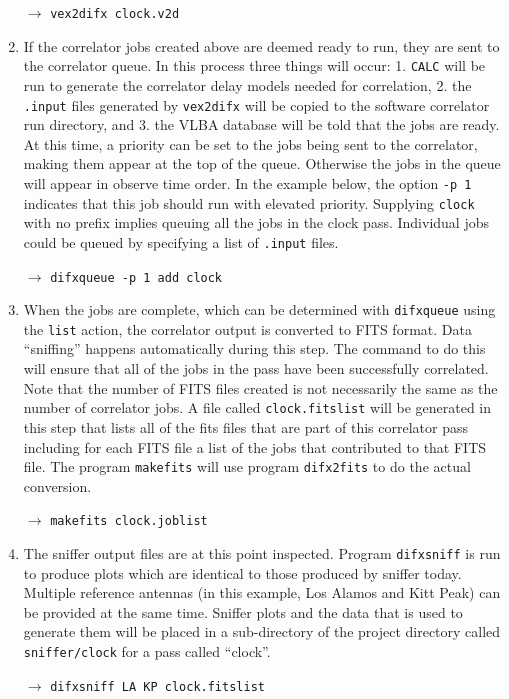 \begin{enumerate}
$\longrightarrow$ {\tt vex2difx clock.v2d}

\item
If the correlator jobs created above are deemed ready to run, they are sent to the correlator queue.
In this process three things will occur: 1. {\tt CALC} will be run to generate the correlator delay models needed for correlation, 2. the {\tt .input} files generated by {\tt vex2difx} will be copied to the software correlator run directory, and 3. the VLBA database will be told that the jobs are ready.
At this time, a priority can be set to the jobs being sent to the correlator, making them appear at the top of the queue.
Otherwise the jobs in the queue will appear in observe time order.
In the example below, the option {\tt -p 1} indicates that this job should run with elevated priority.
Supplying {\tt clock} with no prefix implies queuing all the jobs in the clock pass.
Individual jobs could be queued by specifying a list of {\tt .input} files.

$\longrightarrow$ {\tt difxqueue -p 1 add clock}

\item
When the jobs are complete, which can be determined with {\tt difxqueue} using the {\tt list} action, the correlator output is converted to FITS format.
Data ``sniffing'' happens automatically during this step.
The command to do this will ensure that all of the jobs in the pass have been successfully correlated.
Note that the number of FITS files created is not necessarily the same as the number of correlator jobs.
A file called {\tt clock.fitslist} will be generated in this step that lists all of the fits files that are part of this correlator pass including for each FITS file a list of the jobs that contributed to that FITS file. 
The program {\tt makefits} will use program {\tt difx2fits} to do the actual conversion.


$\longrightarrow$ {\tt makefits clock.joblist}

\item
The sniffer output files are at this point inspected.
Program {\tt difxsniff} is run to produce plots which are identical to those produced by sniffer today. 
Multiple reference antennas (in this example, Los Alamos and Kitt Peak) can be provided at the same time.
Sniffer plots and the data that is used to generate them will be placed in a sub-directory of the project directory called {\tt sniffer/clock} for a pass called ``clock''.

$\longrightarrow$ {\tt difxsniff LA KP clock.fitslist}


\end{enumerate}
